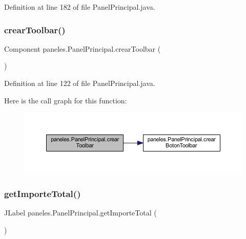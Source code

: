 Definition at line 182 of file Panel\+Principal.\+java.

\mbox{\label{classpaneles_1_1_panel_principal_accd82709ae4701f14d1b5a4bbb8f3aae}} 
\subsubsection{\texorpdfstring{crear\+Toolbar()}{crearToolbar()}}
{\footnotesize\ttfamily Component paneles.\+Panel\+Principal.\+crear\+Toolbar (\begin{DoxyParamCaption}{ }\end{DoxyParamCaption})}



Definition at line 122 of file Panel\+Principal.\+java.

Here is the call graph for this function\+:\nopagebreak
\begin{figure}[H]
\begin{center}
\leavevmode
\includegraphics[width=350pt]{classpaneles_1_1_panel_principal_accd82709ae4701f14d1b5a4bbb8f3aae_cgraph}
\end{center}
\end{figure}
\mbox{\label{classpaneles_1_1_panel_principal_a5ee2138a32b7b6bc6a0f7b3bd68f4821}} 
\subsubsection{\texorpdfstring{get\+Importe\+Total()}{getImporteTotal()}}
{\footnotesize\ttfamily J\+Label paneles.\+Panel\+Principal.\+get\+Importe\+Total (\begin{DoxyParamCaption}{ }\end{DoxyParamCaption})}



